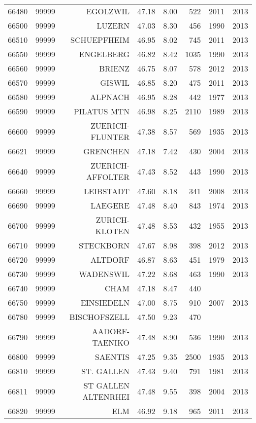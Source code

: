\begin{longtable}{rrrrrrrr}
  66480 & 99999 & EGOLZWIL & 47.18 & 8.00 & 522 & 2011 & 2013 \\ 
  66500 & 99999 & LUZERN & 47.03 & 8.30 & 456 & 1990 & 2013 \\ 
  66510 & 99999 & SCHUEPFHEIM & 46.95 & 8.02 & 745 & 2011 & 2013 \\ 
  66550 & 99999 & ENGELBERG & 46.82 & 8.42 & 1035 & 1990 & 2013 \\ 
  66560 & 99999 & BRIENZ & 46.75 & 8.07 & 578 & 2012 & 2013 \\ 
  66570 & 99999 & GISWIL & 46.85 & 8.20 & 475 & 2011 & 2013 \\ 
  66580 & 99999 & ALPNACH & 46.95 & 8.28 & 442 & 1977 & 2013 \\ 
  66590 & 99999 & PILATUS MTN & 46.98 & 8.25 & 2110 & 1989 & 2013 \\ 
  66600 & 99999 & ZUERICH-FLUNTER & 47.38 & 8.57 & 569 & 1935 & 2013 \\ 
  66621 & 99999 & GRENCHEN & 47.18 & 7.42 & 430 & 2004 & 2013 \\ 
  66640 & 99999 & ZUERICH-AFFOLTER & 47.43 & 8.52 & 443 & 1990 & 2013 \\ 
  66660 & 99999 & LEIBSTADT & 47.60 & 8.18 & 341 & 2008 & 2013 \\ 
  66690 & 99999 & LAEGERE & 47.48 & 8.40 & 843 & 1974 & 2013 \\ 
  66700 & 99999 & ZURICH-KLOTEN & 47.48 & 8.53 & 432 & 1955 & 2013 \\ 
  66710 & 99999 & STECKBORN & 47.67 & 8.98 & 398 & 2012 & 2013 \\ 
  66720 & 99999 & ALTDORF & 46.87 & 8.63 & 451 & 1979 & 2013 \\ 
  66730 & 99999 & WADENSWIL & 47.22 & 8.68 & 463 & 1990 & 2013 \\ 
  66740 & 99999 & CHAM & 47.18 & 8.47 & 440 &  &  \\ 
  66750 & 99999 & EINSIEDELN & 47.00 & 8.75 & 910 & 2007 & 2013 \\ 
  66780 & 99999 & BISCHOFSZELL & 47.50 & 9.23 & 470 &  &  \\ 
  66790 & 99999 & AADORF-TAENIKO & 47.48 & 8.90 & 536 & 1990 & 2013 \\ 
  66800 & 99999 & SAENTIS & 47.25 & 9.35 & 2500 & 1935 & 2013 \\ 
  66810 & 99999 & ST. GALLEN & 47.43 & 9.40 & 791 & 1981 & 2013 \\ 
  66811 & 99999 & ST GALLEN ALTENRHEI & 47.48 & 9.55 & 398 & 2004 & 2013 \\ 
  66820 & 99999 & ELM & 46.92 & 9.18 & 965 & 2011 & 2013 \\ 

\end{longtable}

